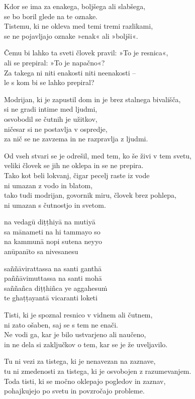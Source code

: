 \clearpage

Kdor se ima za enakega, boljšega ali slabšega,\\
se bo boril glede na te oznake.\\
Tistemu, ki ne okleva med temi tremi razlikami,\\
se ne pojavljajo oznake »enak« ali »boljši«.

Čemu bi lahko ta sveti človek pravil: »To je resnica«,\\
ali se prepiral: »To je napačno«?\\
Za takega ni niti enakosti niti neenakosti --\\
le s kom bi se lahko prepiral?

Modrijan, ki je zapustil dom in je brez stalnega bivališča,\\
si ne gradi intime med ljudmi,\\
osvobodil se čutnih je užitkov,\\\vin ničesar si ne postavlja v ospredje,\\
za nič se ne zavzema in ne razpravlja z ljudmi.

Od vseh stvari se je odrešil, med tem, ko še živi v tem svetu,\\
veliki človek se jih ne oklepa in se ne prepira.\\
Tako kot beli lokvanj, čigar pecelj raste iz vode\\
ni umazan z vodo in blatom,\\
tako tudi modrijan, govornik miru, človek brez pohlepa,\\
ni umazan s čutnostjo in svetom.


\clearpage

na vedagū diṭṭhiyā na mutiyā\\
sa mānameti na hi tammayo so\\
na kammunā nopi sutena neyyo\\
anūpanīto sa nivesanesu

saññāvirattassa na santi ganthā\\
paññāvimuttassa na santi mohā\\
saññañca diṭṭhiñca ye aggahesuṁ\\
te ghaṭṭayantā vicaranti loketi


\clearpage

Tisti, ki je spoznal resnico v vidnem ali čutnem,\\
ni zato ošaben, saj se s tem ne enači.\\
Ne vodi ga, kar je bilo ustvarjeno ali naučeno,\\
in ne dela si zaključkov o tem, kar se je že uveljavilo.

Tu ni vezi za tistega, ki je nenavezan na zaznave,\\
tu ni zmedenosti za tistega, ki je osvobojen z razumevanjem.\\
Toda tisti, ki se močno oklepajo pogledov in zaznav,\\
pohajkujejo po svetu in povzročajo probleme.

